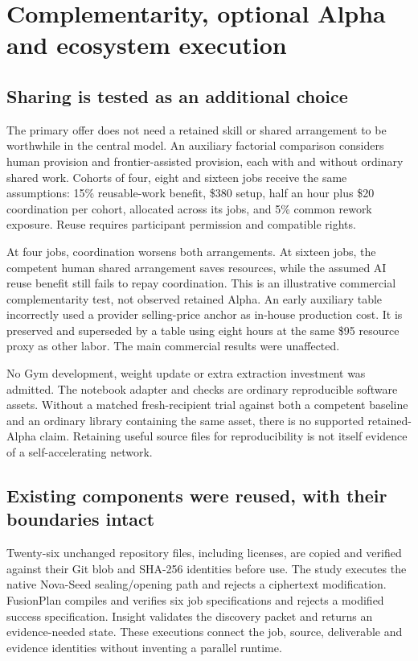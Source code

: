 \section{Complementarity, optional Alpha and ecosystem execution}
\subsection{Sharing is tested as an additional choice}
The primary offer does not need a retained skill or shared arrangement to be worthwhile in the central model. An auxiliary factorial comparison considers human provision and frontier-assisted provision, each with and without ordinary shared work. Cohorts of four, eight and sixteen jobs receive the same assumptions: 15\% reusable-work benefit, \$380 setup, half an hour plus \$20 coordination per cohort, allocated across its jobs, and 5\% common rework exposure. Reuse requires participant permission and compatible rights.

At four jobs, coordination worsens both arrangements. At sixteen jobs, the competent human shared arrangement saves resources, while the assumed AI reuse benefit still fails to repay coordination. This is an illustrative commercial complementarity test, not observed retained Alpha. An early auxiliary table incorrectly used a provider selling-price anchor as in-house production cost. It is preserved and superseded by a table using eight hours at the same \$95 resource proxy as other labor. The main commercial results were unaffected.

No Gym development, weight update or extra extraction investment was admitted. The notebook adapter and checks are ordinary reproducible software assets. Without a matched fresh-recipient trial against both a competent baseline and an ordinary library containing the same asset, there is no supported retained-Alpha claim. Retaining useful source files for reproducibility is not itself evidence of a self-accelerating network.

\subsection{Existing components were reused, with their boundaries intact}
Twenty-six unchanged repository files, including licenses, are copied and verified against their Git blob and SHA-256 identities before use. The study executes the native Nova-Seed sealing/opening path and rejects a ciphertext modification. FusionPlan compiles and verifies six job specifications and rejects a modified success specification. Insight validates the discovery packet and returns an evidence-needed state. These executions connect the job, source, deliverable and evidence identities without inventing a parallel runtime.

